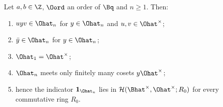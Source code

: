 Let $a,b\in\Z$, $\Oord$ an order of $\Bq$ and $n\ge1$. Then:
\begin{enumerate}[label=(\alph*)]
\item $uyv\in\Ohat_n$ for $y\in\Ohat_n$ and $u,v\in\Ohat^\times$;
\item $\bar y\in\Ohat_n$ for $y\in\Ohat_n$;
\item $\Ohat_1=\Ohat^\times$;
\item $\Ohat_n$ meets only finitely many cosets $y\Ohat^\times$;
\item hence the indicator $\mathbf 1_{\Ohat_n}$ lies in $\mathcal H(\Bhat^\times,\Ohat^\times;R_0)$ for every commutative ring $R_0$.
\end{enumerate}

